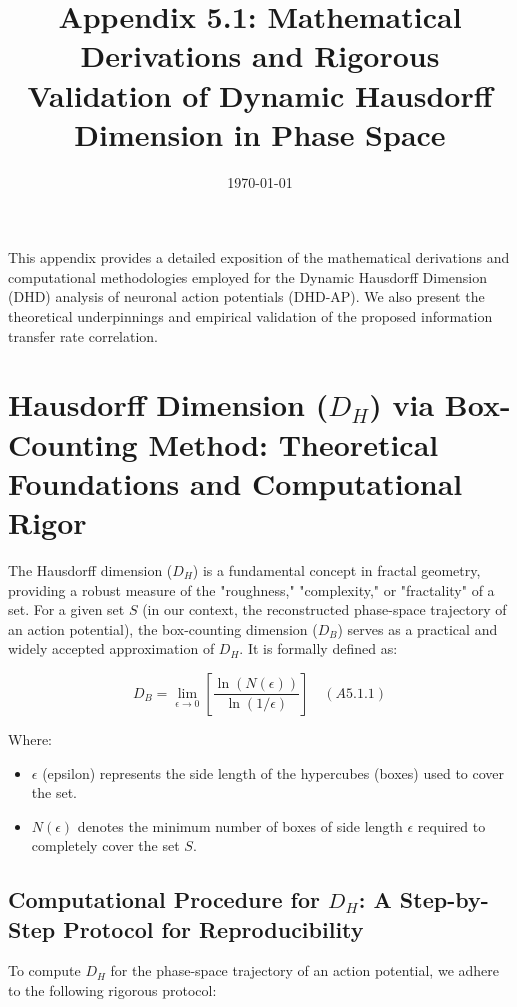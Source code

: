 \documentclass{article}
\title{Appendix 5.1: Mathematical Derivations and Rigorous Validation of Dynamic Hausdorff Dimension in Phase Space}
\date{\today}
\begin{document}
\maketitle

This appendix provides a detailed exposition of the mathematical derivations and computational methodologies employed for the Dynamic Hausdorff Dimension (DHD) analysis of neuronal action potentials (DHD-AP). We also present the theoretical underpinnings and empirical validation of the proposed information transfer rate correlation.

\section{Hausdorff Dimension ($D_H$) via Box-Counting Method: Theoretical Foundations and Computational Rigor}

The Hausdorff dimension ($D_H$) is a fundamental concept in fractal geometry, providing a robust measure of the "roughness," "complexity," or "fractality" of a set. For a given set $S$ (in our context, the reconstructed phase-space trajectory of an action potential), the box-counting dimension ($D_B$) serves as a practical and widely accepted approximation of $D_H$. It is formally defined as:

\[
D_B = \lim_{\epsilon \to 0} \left[ \frac{\ln(N(\epsilon))}{\ln(1/\epsilon)} \right] \quad (A5.1.1)
\]

Where:
\begin{itemize}
    \item $\epsilon$ (epsilon) represents the side length of the hypercubes (boxes) used to cover the set.
    \item $N(\epsilon)$ denotes the minimum number of boxes of side length $\epsilon$ required to completely cover the set $S$.
\end{itemize}

\subsection{Computational Procedure for $D_H$: A Step-by-Step Protocol for Reproducibility}

To compute $D_H$ for the phase-space trajectory of an action potential, we adhere to the following rigorous protocol:
\end{document}
